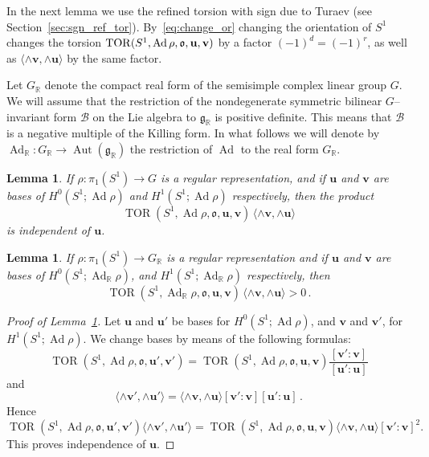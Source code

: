 \documentclass[11pt]{article}
\newtheorem{lemm}[theo]{Lemma}
\theoremstyle{definition}
\numberwithin{equation}{section}
\numberwithin{figure}{section}
\numberwithin{table}{section}
\DeclareMathOperator{\TOR}{TOR}
\DeclareMathOperator{\Ad}{Ad}
\DeclareMathOperator{\Aut}{Aut}
\newcommand{\Bcal}{\mathcal{B}}
\newcommand{\Rbb}{\mathbb {R}}
\newcommand{\gfrk}{\mathfrak{g}}
\newcommand{\ofrk}{\mathfrak{o}}
\newcommand{\ubf}{\mathbf{u}}
\newcommand{\vbf}{\mathbf{v}}
\newcommand*\dG{{d}}
\begin{document}
In the next lemma we use the refined torsion with sign due to Turaev (see Section~\ref{sec:sgn_ref_tor}). By~\eqref{eq:change_or} changing the orientation of $S^1$ changes the torsion $\TOR(S^1,\Ad\rho,\ofrk,\linebreak\ubf,\vbf)$ by a factor $(-1)^{\dG}= (-1)^r$, as well as $\langle \wedge\vbf, \wedge\ubf \rangle$ by the same factor.


Let $G_\Rbb$ denote the compact real form of the semisimple complex linear group $G$. We will assume that the restriction of the nondegenerate symmetric bilinear $G$--invariant form $\Bcal$ on the Lie algebra to $\gfrk_\Rbb$ is positive definite. This means that $\Bcal$ is a negative multiple of the Killing form. In what follows we will denote by $\Ad_\Rbb\colon G_\Rbb\to \Aut(\gfrk_\Rbb)$ the restriction of $\Ad$ to the real form $G_\Rbb$.

\begin{lemm}\label{lemma:independent}
If $\rho\colon \pi_1(S^1)\to G$ is a regular representation, and if $\ubf$ and $\vbf$ are bases of $H^0(S^1;\Ad\rho)$ and $H^1(S^1;\Ad\rho)$ respectively, then the product
\[
\TOR(S^1,\Ad\rho,\ofrk, \ubf,\vbf)
\, \langle \wedge\vbf, \wedge\ubf \rangle
\]
is independent of $\ubf$.
\end{lemm}

\begin{lemm}\label{lemma:positive}
If $\rho\colon \pi_1(S^1)\to G_\Rbb$ is a regular representation and if $\ubf$ and $\vbf$ are bases of $H^0(S^1;\Ad_\Rbb\rho) $, and $H^1(S^1;\Ad_\Rbb\rho) $ respectively, then
\[
\TOR(S^1,\Ad_\Rbb\rho, \ofrk,\ubf,\vbf)
\, \langle \wedge\vbf, \wedge\ubf \rangle >0\,.
\]
\end{lemm}


\begin{proof}[Proof of Lemma~\ref{lemma:independent}] Let $\ubf$ and $\ubf'$ be bases for $H^0(S^1;\Ad\rho)$, and $\vbf$ and $\vbf'$, for $H^1(S^1;\Ad\rho)$.
We change bases by means of the following formulas:
\[
\TOR(S^1,\Ad\rho,\ofrk, \ubf',\vbf')=
\TOR(S^1,\Ad\rho, \ofrk, \ubf,\vbf)
\frac{[\vbf': \vbf]}{[\ubf': \ubf]}
\]
and
\[
\langle \wedge \vbf', \wedge \ubf' \rangle = \langle \wedge \vbf, \wedge \ubf \rangle {[\vbf': \vbf]}{[\ubf': \ubf]}\,.
\]
Hence
\begin{equation}\label{eqn:change}
\TOR(S^1,\Ad\rho, \ofrk, \ubf',\vbf') \langle \wedge \vbf', \wedge \ubf' \rangle =
\TOR(S^1,\Ad\rho, \ofrk, \ubf,\vbf) \langle \wedge \vbf, \wedge \ubf \rangle [\vbf': \vbf]^2.
\end{equation}
This proves independence of $\ubf$.
\end{proof}
\end{document}
